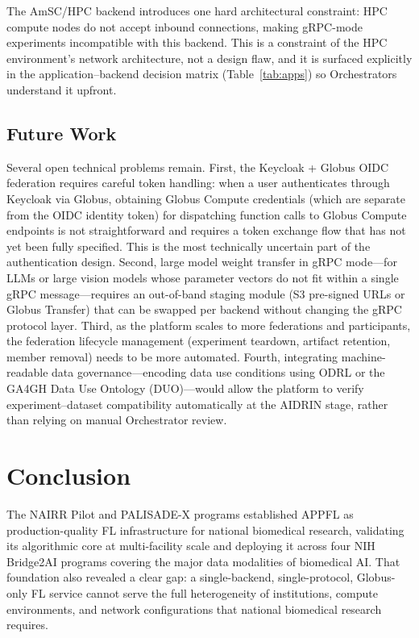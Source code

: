 \documentclass[conference]{IEEEtran}
\begin{document}
The AmSC/HPC backend introduces one hard architectural constraint: HPC
compute nodes do not accept inbound connections, making gRPC-mode
experiments incompatible with this backend. This is a constraint of
the HPC environment's network architecture, not a design flaw, and it
is surfaced explicitly in the application--backend decision matrix
(Table~\ref{tab:apps}) so Orchestrators understand it upfront.

\subsection{Future Work}

Several open technical problems remain. First, the Keycloak + Globus
OIDC federation requires careful token handling: when a user
authenticates through Keycloak via Globus, obtaining Globus Compute
credentials (which are separate from the OIDC identity token) for
dispatching function calls to Globus Compute endpoints is not
straightforward and requires a token exchange flow that has not yet
been fully specified. This is the most technically uncertain part of
the authentication design. Second, large model weight transfer in
gRPC mode---for LLMs or large vision models whose parameter vectors do
not fit within a single gRPC message---requires an out-of-band staging
module (S3 pre-signed URLs or Globus Transfer) that can be swapped per
backend without changing the gRPC protocol layer. Third, as the
platform scales to more federations and participants, the federation
lifecycle management (experiment teardown, artifact retention, member
removal) needs to be more automated. Fourth, integrating machine-readable
data governance---encoding data use conditions using ODRL or the GA4GH
Data Use Ontology (DUO)---would allow the platform to verify
experiment--dataset compatibility automatically at the AIDRIN stage,
rather than relying on manual Orchestrator review.

\section{Conclusion}

The NAIRR Pilot and PALISADE-X programs established APPFL as
production-quality FL infrastructure for national biomedical research,
validating its algorithmic core at multi-facility scale and deploying
it across four NIH Bridge2AI programs covering the major data modalities
of biomedical AI. That foundation also revealed a clear gap: a
single-backend, single-protocol, Globus-only FL service cannot serve
the full heterogeneity of institutions, compute environments, and
network configurations that national biomedical research requires.
\end{document}
